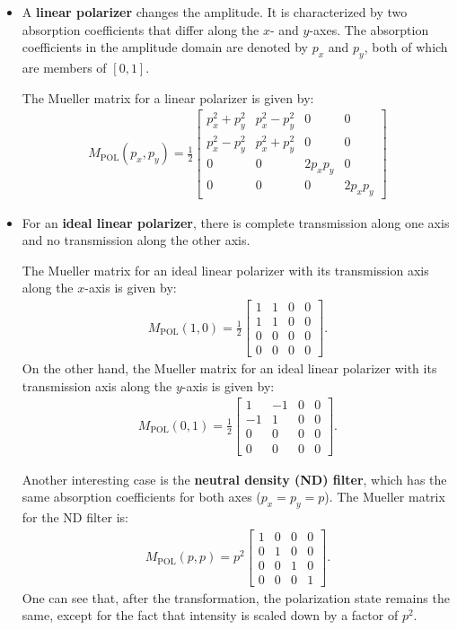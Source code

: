 \documentclass[10pt]{article}
\begin{document}
\begin{itemize}
		\item A \textbf{linear polarizer} changes the amplitude.  It is characterized by two absorption coefficients that differ along the $x$- and $y$-axes.  The absorption coefficients in the amplitude domain are denoted by $p_x$ and $p_y$, both of which are members of $[0,1]$.

		The Mueller matrix for a linear polarizer is given by:
		\begin{align*}
			M_{\mathrm{POL}}(p_x, p_y)= \frac{1}{2} \begin{bmatrix}
				p_x^2 + p_y^2 & p_x^2 - p_y^2 & 0 & 0 \\
				p_x^2 - p_y^2 & p_x^2 + p_y^2 & 0 & 0 \\
				0 & 0 & 2p_x p_y & 0 \\
				0 & 0 & 0 & 2p_x p_y
			\end{bmatrix}
		\end{align*}

		\item For an \textbf{ideal linear polarizer}, there is complete transmission along one axis and no transmission along the other axis.

		The Mueller matrix for an ideal linear polarizer with its transmission axis along the $x$-axis is given by:
		\begin{align*}
			M_{\mathrm{POL}}(1,0) = \frac{1}{2} \begin{bmatrix}
				1 & 1 & 0 & 0 \\
				1 & 1 & 0 & 0 \\
				0 & 0 & 0 & 0 \\
				0 & 0 & 0 & 0
			\end{bmatrix}.
		\end{align*}
		On the other hand, the Mueller matrix for an ideal linear polarizer with its transmission axis along the $y$-axis is given by:
		\begin{align*}
			M_{\mathrm{POL}}(0,1) = \frac{1}{2} \begin{bmatrix}
				1 & -1 & 0 & 0 \\
				-1 & 1 & 0 & 0 \\
				0 & 0 & 0 & 0 \\
				0 & 0 & 0 & 0
			\end{bmatrix}.
		\end{align*}

		Another interesting case is the \textbf{neutral density (ND) filter}, which has the same absorption coefficients for both axes ($p_x = p_y = p$).  The Mueller matrix for the ND filter is:
		\begin{align*}
			M_{\mathrm{POL}}(p,p) = p^2 \begin{bmatrix}
				1 & 0 & 0 & 0 \\
				0 & 1 & 0 & 0 \\
				0 & 0 & 1 & 0 \\
				0 & 0 & 0 & 1
			\end{bmatrix}.
		\end{align*}
		One can see that, after the transformation, the polarization state remains the same, except for the fact that intensity is scaled down by a factor of $p^2$.


\end{itemize}
\end{document}
